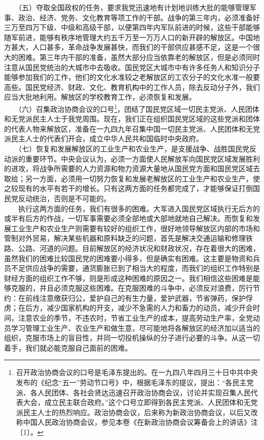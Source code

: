 \documentclass[cn,11pt,chinese]{elegantbook}
\begin{document}
　　（五）夺取全国政权的任务，要求我党迅速地有计划地训练大批的能够管理军事、政治、经济、党务、文化教育等项工作的干部。战争的第三年内，必须准备好三万至四万下级、中级和高级干部，以便第四年内军队前进的时候，这些干部能够随军前进，能够有秩序地管理大约五千万至一万万人口的新开辟的解放区。中国地方甚大，人口甚多，革命战争发展甚快，而我们的干部供应甚感不足，这是一个很大的困难。第三年内干部的准备，虽然大部分应当依靠老的解放区，但是必须同时注意从国民党统治的大城市中去吸收。国民党区大城市中有许多任务人和知识分子能够参加我们的工作，他们的文化水准较之老解放区的工农分子的文化水准一般要高些。国民党经济、财政、文化、教育机构中的工作人员，除去反动分子外，我们应当大批地利用。解放区的学校教育工作，必须恢复和发展。\\
　　（六）召集政治协商会议的口号\footnote[5]{ 召开政治协商会议的口号是毛泽东提出的。在一九四八年四月三十日中共中央发布的《纪念“五一”劳动节口号》中，根据毛泽东的提议，提出：“各民主党派、各人民团体、各社会贤达迅速召开政治协商会议，讨论并实现召集人民代表大会，成立民主联合政府。”这个口号立即得到各民主党派、人民团体和无党派民主人士的热烈响应。政治协商会议，后来称为新政治协商会议，以后又改称中国人民政治协商会议，参见本卷《在新政治协商会议筹备会上的讲话》注〔1〕。}，团结了国民党区域一切民主党派、人民团体和无党派民主人士于我党周围。现在，我们正在组织国民党区域的这些党派和团体的代表人物来解放区，准备在一九四九年召集中国一切民主党派、人民团体和无党派民主人士的代表们开会，成立中华人民共和国临时中央政府。\\
　　（七）恢复和发展解放区的工业生产和农业生产，是支援战争、战胜国民党反动派的重要环节。中央会议认为，必须一方面使人民解放军向国民党区域发展胜利的进攻，将战争所需要的人力资源和物力资源大量地从国民党方面和国民党区域去取给；另一方面，必须用一切努力恢复和发展老解放区的工业生产和农业生产，使之较现有的水平有若干的增长。只有这两方面的任务都完成了，才能够保证打倒国民党反动统治，否则是不可能的。\\
　　执行这两方面的任务，我们有很多的困难。大军进入国民党区域执行无后方的或半有后方的作战，一切军事需要必须全部地或大部地就地自己解决。而恢复和发展工业生产和农业生产则需要有较好的组织工作，很好地领导解放区内部的市场和管制对外贸易，解决某些机器和原料缺乏的问题，首先是解决交通运输和修理铁路、公路、河道的问题。目前解放区的经济状况和财政状况，存在着很大的困难，虽然我们的困难比较国民党的困难要小得多，但是确实有困难。这主要是物资和兵员不足供应战争的需要，通货膨胀已到了相当大的程度，而我们的组织工作特别是财经方面的组织工作不够，则是形成这种困难的原因之一。我们相信这些困难是能够克服的，并且必须克服这些困难。在克服困难的斗争中，必须反对浪费，厉行节约：在前线注意缴获归公，爱护自己的有生力量，爱护武器，节省弹药，保护俘虏；在后方，减少国家机构的开支，减少不急需的人力和畜力的动员，减少开会时间，注意农业的季节，不违农时，节省工业生产的成本，提高劳动生产率，全党动员学习管理工业生产、农业生产和做生意，尽可能地将各解放区的经济加以适当的组织，克服市场上的盲目性，并同一切投机操纵的分子进行必要的斗争。从这一切着手，我们就必能克服自己面前的困难。\\
\end{document}
